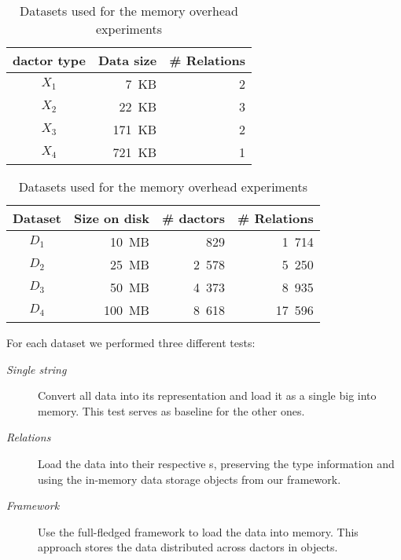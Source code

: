   \begin{table}
    \centering
    \begin{subtable}[t]{0.445\textwidth}
      \centering
      \begin{tabular}{@{}crr@{}}
        \toprule
        \textbf{\Gls{dactor} type} & \textbf{Data size} & \textbf{\# Relations}\\
        \midrule
        $X_1$ &   7~KB & 2 \\ %
        $X_2$ &  22~KB & 3 \\ %
        $X_3$ & 171~KB & 2 \\ %
        $X_4$ & 721~KB & 1 \\ %
        \bottomrule
      \end{tabular}
      \label{tab:datasets:size_distribution}
    \end{subtable}
    \begin{subtable}[t]{0.545\textwidth}
      \centering
      \begin{tabular}{@{}crrr@{}}
        \toprule
        \textbf{Dataset} & \textbf{Size on disk} & \textbf{\# \Glspl{dactor}} & \textbf{\# Relations}\\
        \midrule
        $D_1$ & 10~MB & 829 & 1~714 \\
        $D_2$ & 25~MB & 2~578 & 5~250 \\
        $D_3$ & 50~MB & 4~373 & 8~935 \\
        $D_4$ & 100~MB & 8~618 & 17~596 \\
        \bottomrule
      \end{tabular}
      \label{tab:datasets:keyfigures}
    \end{subtable}
    \caption{Datasets used for the memory overhead experiments}
    \label{tab:datasets}
  \end{table}

  For each dataset we performed three different tests:
  \begin{description}
    \item[\textit{Single string}] Convert all data into its  representation and load it as a single big  into memory.
      This test serves as baseline for the other ones.
    \item[\textit{Relations}] Load the data into their respective s, preserving the type information and using the in-memory data storage objects from our framework.
    \item[\textit{Framework}] Use the full-fledged framework to load the data into memory.
      This approach stores the data distributed across \glspl{dactor} in  objects.
  \end{description}

